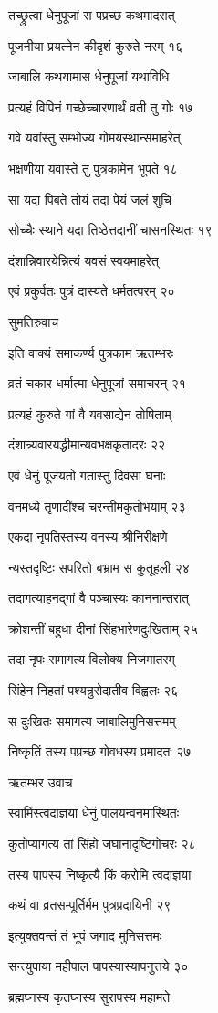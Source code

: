 तच्छ्रुत्वा धेनुपूजां स पप्रच्छ कथमादरात्

पूजनीया प्रयत्नेन कीदृशं कुरुते नरम् १६

जाबालि कथयामास धेनुपूजां यथाविधि

प्रत्यहं विपिनं गच्छेच्चारणार्थं व्रती तु गोः १७

गवे यवांस्तु सम्भोज्य गोमयस्थान्समाहरेत्

भक्षणीया यवास्ते तु पुत्रकामेन भूपते १८

सा यदा पिबते तोयं तदा पेयं जलं शुचि

सोच्चैः स्थाने यदा तिष्ठेत्तदानीं चासनस्थितः १९

दंशान्निवारयेन्नित्यं यवसं स्वयमाहरेत्

एवं प्रकुर्वतः पुत्रं दास्यते धर्मतत्परम् २०

सुमतिरुवाच

इति वाक्यं समाकर्ण्य पुत्रकाम ऋतम्भरः

व्रतं चकार धर्मात्मा धेनुपूजां समाचरन् २१

प्रत्यहं कुरुते गां वै यवसाद्येन तोषिताम्

दंशान्न्यवारयद्धीमान्यवभक्षकृतादरः २२

एवं धेनुं पूजयतो गतास्तु दिवसा घनाः

वनमध्ये तृणादींश्च चरन्तीमकुतोभयाम् २३

एकदा नृपतिस्तस्य वनस्य श्रीनिरीक्षणे

न्यस्तदृष्टिः सपरितो बभ्राम स कुतूहली २४

तदागत्याहनद्गां वै पञ्चास्यः काननान्तरात्

क्रोशन्तीं बहुधा दीनां सिंहभारेणदुःखिताम् २५

तदा नृपः समागत्य विलोक्य निजमातरम्

सिंहेन निहतां पश्यन्रुरोदातीव विह्वलः २६

स दुःखितः समागत्य जाबालिमुनिसत्तमम्

निष्कृतिं तस्य पप्रच्छ गोवधस्य प्रमादतः २७

ऋतम्भर उवाच

स्वामिंस्त्वदाज्ञया धेनुं पालयन्वनमास्थितः

कुतोप्यागत्य तां सिंहो जघानादृष्टिगोचरः २८

तस्य पापस्य निष्कृत्यै किं करोमि त्वदाज्ञया

कथं वा व्रतसम्पूर्तिर्मम पुत्रप्रदायिनी २९

इत्युक्तवन्तं तं भूपं जगाद मुनिसत्तमः

सन्त्युपाया महीपाल पापस्यास्यापनुत्तये ३०

ब्रह्मघ्नस्य कृतघ्नस्य सुरापस्य महामते

